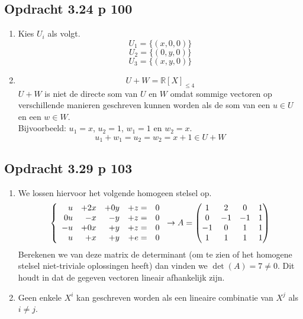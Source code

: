 \documentclass[lineaire_algebra_oplossingen.tex]{subfiles}
\begin{document}
\subsection{Opdracht 3.24 p 100} %
\label{3.24}
\begin{enumerate}
\item
Kies $U_i$ als volgt.
$$U_1 = \{(x,0,0)\} $$
$$U_2 =  \{ (0,y,0)\} $$
$$U_3 = \{ (x,y,0)\} $$

\item
\[
U + W = \mathbb{R}[X]_{\le 4}
\]
$U+W$ is niet de directe som van $U$ en $W$ omdat sommige vectoren op verschillende manieren geschreven kunnen worden als de som van een $u\in U$ en een $w\in W$.\\
Bijvoorbeeld:
$u_1 = x$, $u_2 = 1$, $w_1 = 1$ en $w_2 = x$.
\[
u_1 + w_1 = u_2 = w_2 = x+1 \in U+W
\]
\end{enumerate}


\subsection{Opdracht 3.29 p 103}
\label{3.29}
\begin{enumerate}
\item
We lossen hiervoor het volgende homogeen stelsel op.
\[
\left\{
\begin{array}{r r r r r}
u &+ 2x &+ 0y &+ z =& 0\\
0u &- x &- y &+ z =& 0\\
-u &+ 0x &+ y &+z =& 0\\
u &+ x &+ y &+ e =& 0\\
\end{array}
\right.
\rightarrow
A=
\begin{pmatrix}
1 & 2 & 0 & 1\\
0 & -1 & -1 & 1\\
-1 & 0 & 1 & 1\\
1 & 1 & 1 & 1
\end{pmatrix}
\]
Berekenen we van deze matrix de determinant (om te zien of het homogene stelsel niet-triviale oplossingen heeft) dan vinden we $\det(A) = 7\neq 0$.
Dit houdt in dat de gegeven vectoren lineair afhankelijk zijn.

\item
Geen enkele $X^i$ kan geschreven worden als een lineaire combinatie van $X^j$ als $i\neq j$.
\end{enumerate}

\end{document}
